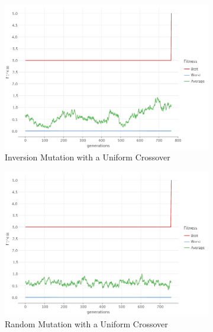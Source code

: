     \begin{figure}[ht!]
        \centering
        \begin{subfigure}{0.45\textwidth}
            \includegraphics[width=\textwidth]{img/beacon_uniform_inv_2.png}
            \caption{Inversion Mutation with a Uniform Crossover}
            \label{fig:beacon:4:inversion}
        \end{subfigure}
        \begin{subfigure}{0.45\textwidth}
            \includegraphics[width=\textwidth]{img/beacon_uniform_random_2.png}
            \caption{Random Mutation with a Uniform Crossover}
            \label{fig:beacon:4:random}
        \end{subfigure}
        \begin{subfigure}{0.45\textwidth}

\end{subfigure}
\end{figure}

